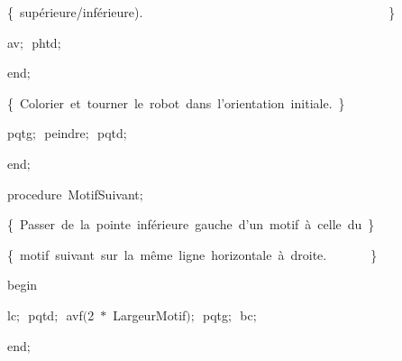 {\vspace{\neglskip}\mbox{\blc  \blk\blk\blk\blk\idt  \cmt  \{\ supérieure/inférieure).\ \ \ \ \ \ \ \ \ \ \ \ \ \ \ \ \ \ \ \ \ \ \ \ \ \ \ \ \ \ \ \ \ \ \ \ \ \ \ \}\idt }\par 
\vspace{\neglskip}\mbox{\blc  \blk\blk\blk\blk\idt  av$;$\ phtd$;$\ }\par 
\vspace{\neglskip}\mbox{\blc  \blk\blk\blk\idt  \mcl end\idt $;$}\par 
\vspace{\neglskip}\mbox{\blc  \blk\blk\idt  \cmt  \{\ Colorier\ et\ tourner\ le\ robot\ dans\ l{'}orientation\ initiale.\ \}\idt }\par 
\vspace{\neglskip}\mbox{\blc  \blk\blk\idt  pqtg$;$\ peindre$;$\ pqtd$;$}\par 
\vspace{\neglskip}\mbox{\blc  \blk\idt  \mcl end\idt $;$}\par 
\medskip

\pagebreak[3] 
\vspace{\neglskip}\mbox{\blc  \blk\idt  \mcl procedure\idt \ MotifSuivant$;$}\par 
\vspace{\neglskip}\mbox{\blc  \blk\blk\idt  \cmt  \{\ Passer\ de\ la\ pointe\ inférieure\ gauche\ d{'}un\ motif\ à\ celle\ du\ \}\idt }\par 
\vspace{\neglskip}\mbox{\blc  \blk\blk\idt  \cmt  \{\ motif\ suivant\ sur\ la\ même\ ligne\ horizontale\ à\ droite.\ \ \ \ \ \ \ \}\idt }\par 
\vspace{\neglskip}\mbox{\blc  \blk\idt  \mcl begin\idt }\par 
\vspace{\neglskip}\mbox{\blc  \blk\blk\idt  lc$;$\ pqtd$;$\ avf$($2\ $\ast$\ LargeurMotif$)$$;$\ pqtg$;$\ bc$;$\ }\par 
\vspace{\neglskip}\mbox{\blc  \blk\idt  \mcl end\idt $;$}\par 
\medskip

}
